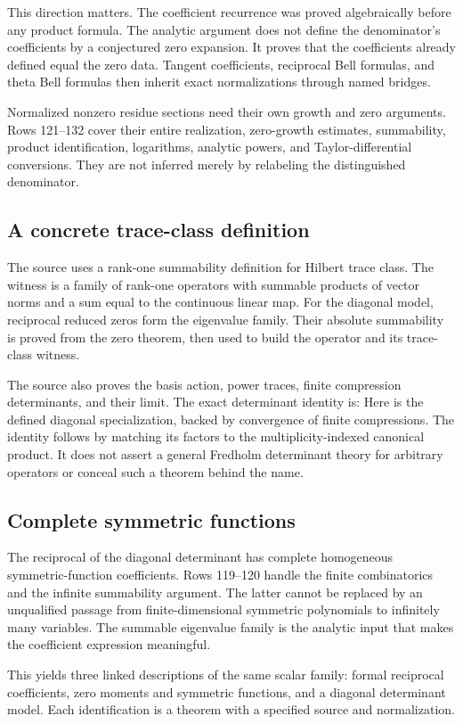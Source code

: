 This direction matters. The coefficient recurrence was proved algebraically before any product formula. The analytic argument does not define the denominator's coefficients by a conjectured zero expansion. It proves that the coefficients already defined equal the zero data. Tangent coefficients, reciprocal Bell formulas, and theta Bell formulas then inherit exact normalizations through named bridges.

Normalized nonzero residue sections need their own growth and zero arguments. Rows 121--132 cover their entire realization, zero-growth estimates, summability, product identification, logarithms, analytic powers, and Taylor-differential conversions. They are not inferred merely by relabeling the distinguished denominator.

\subsection{A concrete trace-class definition}
The source uses a rank-one summability definition for Hilbert trace class.
The witness is a family of rank-one operators with summable products of vector norms and a sum equal to the continuous linear map. For the diagonal model, reciprocal reduced zeros form the eigenvalue family. Their absolute summability is proved from the zero theorem, then used to build the operator and its trace-class witness.

The source also proves the basis action, power traces, finite compression determinants, and their limit. The exact determinant identity is:
Here  is the defined diagonal specialization, backed by convergence of finite compressions. The identity follows by matching its factors to the multiplicity-indexed canonical product. It does not assert a general Fredholm determinant theory for arbitrary operators or conceal such a theorem behind the name.

\subsection{Complete symmetric functions}
The reciprocal of the diagonal determinant has complete homogeneous symmetric-function coefficients. Rows 119--120 handle the finite combinatorics and the infinite summability argument. The latter cannot be replaced by an unqualified passage from finite-dimensional symmetric polynomials to infinitely many variables. The summable eigenvalue family is the analytic input that makes the coefficient expression meaningful.

This yields three linked descriptions of the same scalar family: formal reciprocal coefficients, zero moments and symmetric functions, and a diagonal determinant model. Each identification is a theorem with a specified source and normalization.
